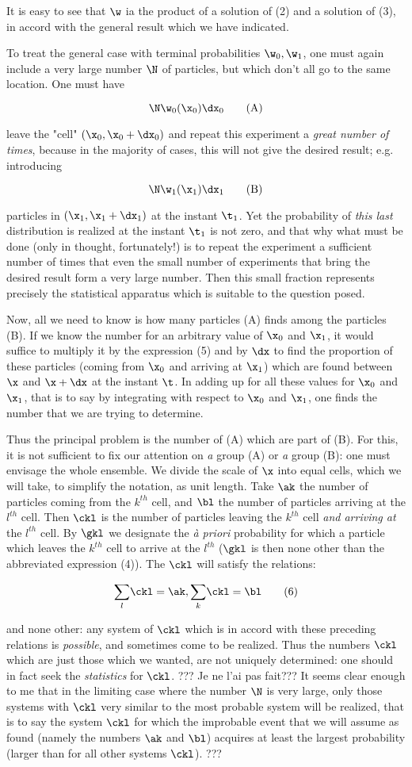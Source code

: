 \documentclass{article}
\newcommand{\nc}[2]{
  \newcommand{#1}{#2}
}
\newcommand{\nequ}[2]{
\begin{equation*}
#1
\tag{#2}
\end{equation*}
}
\newcommand{\var}[1]{#1}
\renewcommand{\it}[1]{\textit{#1}}
\newcommand{\sumk}{\underset{k}{\sum}}
\newcommand{\suml}{\underset{l}{\sum}}
\begin{document}
It is easy to see that $\w$ ia the product of a solution of (2) and a solution of (3), in accord with the general result which we have indicated.

To treat the general case with terminal probabilities $\w_0, \w_1$, one must again include a very large number $\N$ of particles, but which don't all go to the same location. One must have
\nequ{
\N\w_0(\x_0)\dx_0
}{A}
leave the "cell" $(\x_0, \x_0+\dx_0)$ and repeat this experiment a \it{great number of times}, because in the majority of cases, this will not give the desired result; e.g. introducing
\nequ{
\N\w_1(\x_1)\dx_1
}{B}
particles in $(\x_1, \x_1+\dx_1)$ at the instant $\t_1$. Yet the probability of \it{this last} distribution is realized at the instant $\t_1$ is not zero, and that why what must be done (only in thought, fortunately!) is to repeat the experiment a sufficient number of times that even the small number of experiments that bring the desired result form a very large number. Then this small fraction represents precisely the statistical apparatus which is suitable to the question posed.

Now, all we need to know is how many particles (A) finds among the particles (B). If we know the number for an arbitrary value of $\x_0$ and $\x_1$, it would suffice to multiply it by the expression (5) and by $\dx$ to find the proportion of these particles (coming from $\x_0$ and arriving at $\x_1$) which are found between $\x$ and $\x+\dx$ at the instant $\t$. In adding up for all these values for $\x_0$ and $\x_1$, that is to say by integrating with respect to $\x_0$ and $\x_1$, one finds the number that we are trying to determine.

\nc{\kth}{\var{k}^{th}}
\nc{\lth}{\var{l}^{th}}


Thus the principal problem is the number of (A) which are part of (B). For this, it is not sufficient to fix our attention on \it{a} group (A) or \it{a} group (B): one must envisage the whole ensemble. We divide the scale of $\x$ into equal cells, which we will take, to simplify the notation, as unit length. Take $\ak$ the number of particles coming from the $\kth$ cell, and $\bl$ the number of particles arriving at the $\lth$ cell. Then $\ckl$ is the number of particles leaving the $\kth$ cell \it{and arriving at} the $\lth$ cell. By $\gkl$ we designate the \it{à priori} probability for which a particle which leaves the $\kth$ cell to arrive at the $\lth$ ($\gkl$ is then none other than the abbreviated expression (4)). The $\ckl$ will satisfy the relations:
\nequ{
\suml\ckl = \ak, \sumk\ckl = \bl
}{6}
and none other: any system of $\ckl$ which is in accord with these preceding relations is \it{possible}, and sometimes come to be realized. Thus the numbers $\ckl$ which are just those which we wanted, are not uniquely determined: one should in fact seek the \it{statistics} for $\ckl$. ??? Je ne l'ai pas fait??? It seems clear enough to
me that in the limiting case where the number $\N$ is very large, only those systems with $\ckl$ very similar to the most probable system will be realized, that is to say the system $\ckl$ for which the improbable event that we will assume as found (namely the numbers $\ak$ and $\bl$) acquires at least the largest probability (larger than for all other systems $\ckl$). ???
\end{document}
